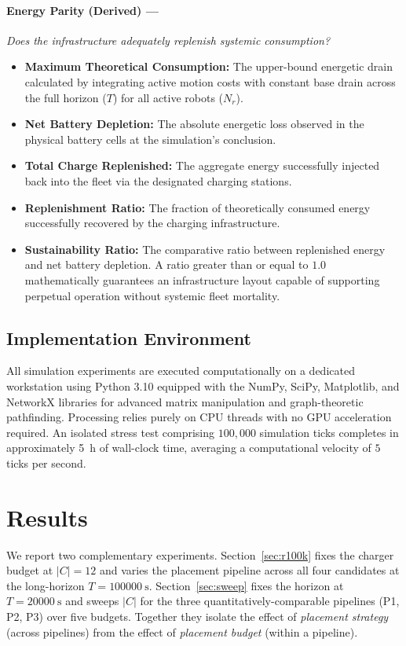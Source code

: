 \documentclass[conference]{IEEEtran}
\begin{document}
\paragraph{Energy Parity (Derived) ---}\textit{Does the infrastructure adequately replenish systemic consumption?}
\begin{itemize}
  \item \textbf{Maximum Theoretical Consumption:} The upper-bound energetic drain calculated by integrating active motion costs with constant base drain across the full horizon ($T$) for all active robots ($N_r$).
  \item \textbf{Net Battery Depletion:} The absolute energetic loss observed in the physical battery cells at the simulation's conclusion.
  \item \textbf{Total Charge Replenished:} The aggregate energy successfully injected back into the fleet via the designated charging stations.
  \item \textbf{Replenishment Ratio:} The fraction of theoretically consumed energy successfully recovered by the charging infrastructure.
  \item \textbf{Sustainability Ratio:} The comparative ratio between replenished energy and net battery depletion. A ratio greater than or equal to $1.0$ mathematically guarantees an infrastructure layout capable of supporting perpetual operation without systemic fleet mortality.
\end{itemize}

\subsection{Implementation Environment}
All simulation experiments are executed computationally on a dedicated workstation using Python 3.10 equipped with the NumPy, SciPy, Matplotlib, and NetworkX libraries for advanced matrix manipulation and graph-theoretic pathfinding. Processing relies purely on CPU threads with no GPU acceleration required. An isolated stress test comprising $100{,}000$ simulation ticks completes in approximately \SI{5}{\hour} of wall-clock time, averaging a computational velocity of $5$ ticks per second.

\section{Results}
\label{sec:results}

We report two complementary experiments. Section~\ref{sec:r100k} fixes the charger budget at $|C| = 12$ and varies the placement pipeline across all four candidates at the long-horizon $T = \SI{100000}{\second}$. Section~\ref{sec:sweep} fixes the horizon at $T = \SI{20000}{\second}$ and sweeps $|C|$ for the three quantitatively-comparable pipelines (P1, P2, P3) over five budgets. Together they isolate the effect of \emph{placement strategy} (across pipelines) from the effect of \emph{placement budget} (within a pipeline).
\end{document}
